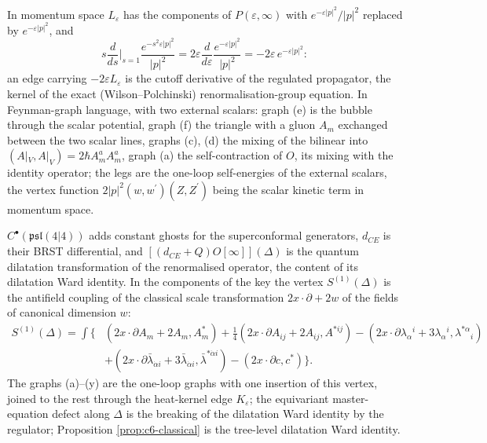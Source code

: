 \begin{remark}
In momentum space $L_\varepsilon$ has the components of $P(\varepsilon,\infty)$ with $e^{-\varepsilon|p|^2}/|p|^2$ replaced by $e^{-\varepsilon|p|^2}$, and
\[
s\frac{d}{ds}\Big|_{s=1}\frac{e^{-s^2\varepsilon|p|^2}}{|p|^2}=2\varepsilon\frac{d}{d\varepsilon}\frac{e^{-\varepsilon|p|^2}}{|p|^2}=-2\varepsilon\,e^{-\varepsilon|p|^2}:
\]
an edge carrying $-2\varepsilon L_\varepsilon$ is the cutoff derivative of the regulated propagator, the kernel of the exact (Wilson--Polchinski) renormalisation-group equation. In Feynman-graph language, with two external scalars: graph (e) is the bubble through the scalar potential, graph (f) the triangle with a gluon $A_m$ exchanged between the two scalar lines, graphs (c), (d) the mixing of the bilinear into $(A|_V,A|_V)=2\hbar A^a_mA^a_m$, graph (a) the self-contraction of $O$, its mixing with the identity operator; the legs are the one-loop self-energies of the external scalars, the vertex function $2|p|^2(w,w^{\prime})(Z,Z^{\prime})$ being the scalar kinetic term in momentum space.
\end{remark}

\begin{remark}
$C^\bullet(\mathfrak{psl}(4|4))$ adds constant ghosts for the superconformal generators, $d_{CE}$ is their BRST differential, and $[(d_{CE}+Q)O[\infty]](\Delta)$ is the quantum dilatation transformation of the renormalised operator, the content of its dilatation Ward identity. In the components of the key the vertex $S^{(1)}(\Delta)$ is the antifield coupling of the classical scale transformation $2x\cdot\partial+2w$ of the fields of canonical dimension $w$:
\[
\begin{aligned}
S^{(1)}(\Delta)=\int\big\{&(2x\cdot\partial A_m+2A_m,A^*_m)+\tfrac14(2x\cdot\partial A_{ij}+2A_{ij},A^{*ij})-(2x\cdot\partial\lambda_\alpha{}^i+3\lambda_\alpha{}^i,\lambda^{*\alpha}{}_i)\\
&+(2x\cdot\partial\bar\lambda_{\dot\alpha i}+3\bar\lambda_{\dot\alpha i},\bar\lambda^{*\dot\alpha i})-(2x\cdot\partial c,c^*)\big\}.
\end{aligned}
\]
The graphs (a)--(y) are the one-loop graphs with one insertion of this vertex, joined to the rest through the heat-kernel edge $K_\varepsilon$; the equivariant master-equation defect along $\Delta$ is the breaking of the dilatation Ward identity by the regulator; Proposition \ref{prop:c6-classical} is the tree-level dilatation Ward identity.
\end{remark}
